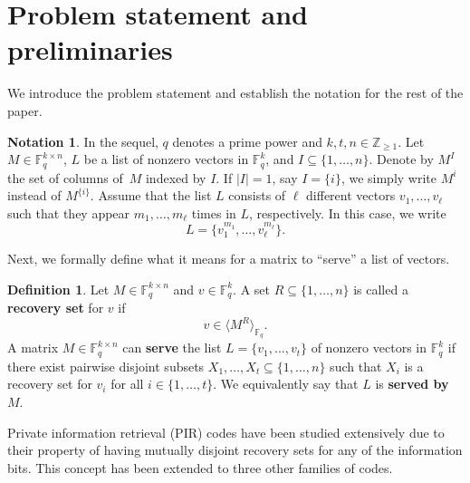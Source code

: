 \documentclass[11pt,a4paper]{article}
\theoremstyle{definition}
\newtheorem{definition}[theorem]{Definition}
\newtheorem{notation}[theorem]{Notation}
\newcommand{\Z}{\mathbb Z}
\newcommand{\F}{\mathbb F}
\newcommand{\ABK}[1]{{\color{orange} Altan: #1}}
\begin{document}

\section{Problem statement and preliminaries}

We introduce the problem statement and establish the notation for the rest of the paper. 

\begin{notation}
In the sequel, $q$ denotes a prime power and $k,t,n \in \Z_{\ge 1}$. Let $M\in\F_q^{k\times n}$, $L$ be a list of nonzero vectors in $\F_q^k$, and $I \subseteq \{1,\ldots,n\}.$ Denote by $M^I$ the set of columns of~$M$ indexed by $I$. If $|I|=1$, say $I =\{i\}$, we simply write $M^i$ instead of $M^{\{i\}}$. Assume that the list $L$ consists of $\ell$ different vectors $v_1,\ldots,v_{\ell}$ such that they appear $m_1,\ldots,m_{\ell}$ times in $L$, respectively. In this case, we write 
$$L=\{v_1^{m_1},\ldots,v_{\ell}^{m_{\ell}}\}.$$
\end{notation}


Next, we formally define what it means for a matrix to ``serve'' a list of vectors.

\begin{definition}
\label{def:recovery}
Let $M\in\F_q^{k\times n}$ and $v \in \F_q^k$. A set $R \subseteq \{1,\ldots,n\}$ is called a \textbf{recovery set} for $v$ if  
$$v \in \langle M^{R} \rangle_{\F_q}.$$
A matrix $M\in\F_q^{k\times n}$ can \textbf{serve} the list $L = \{v_1,\dots, v_t\}$ of nonzero vectors in $\F_q^k$ if there exist pairwise disjoint
subsets $X_1,\dots,X_t\subseteq \{1,\ldots,n\}$ such that
$X_i$ is a recovery set for $v_i$
for all $i \in \{1,\ldots,t\}$. We equivalently say that $L$ is \textbf{served by} $M $. 
\end{definition}

Private information retrieval (PIR) codes have been studied extensively due to their property of having mutually disjoint recovery sets for any of the information bits. This concept has been extended to three other families of codes.
\end{document}

